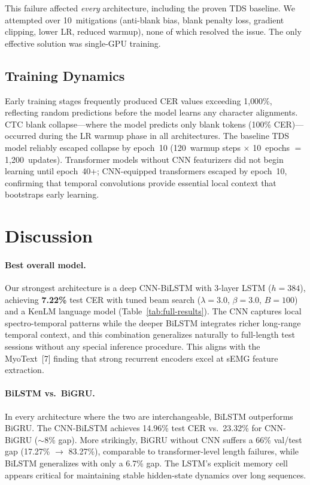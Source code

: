 \documentclass{article}
\begin{document}
This failure affected \emph{every} architecture, including the proven TDS baseline. We attempted over 10~mitigations (anti-blank bias, blank penalty loss, gradient clipping, lower LR, reduced warmup), none of which resolved the issue. The only effective solution was single-GPU training.


\subsection{Training Dynamics}

Early training stages frequently produced CER values exceeding 1{,}000\%, reflecting random predictions before the model learns any character alignments. CTC blank collapse---where the model predicts only blank tokens (100\% CER)---occurred during the LR warmup phase in all architectures. The baseline TDS model reliably escaped collapse by epoch~10 (120~warmup steps $\times$ 10~epochs $=$ 1{,}200~updates). Transformer models without CNN featurizers did not begin learning until epoch~40+; CNN-equipped transformers escaped by epoch~10, confirming that temporal convolutions provide essential local context that bootstraps early learning.


\section{Discussion}

\paragraph{Best overall model.} Our strongest architecture is a deep CNN-BiLSTM with 3-layer LSTM ($h{=}384$), achieving \textbf{7.22\%} test CER with tuned beam search ($\lambda{=}3.0$, $\beta{=}3.0$, $B{=}100$) and a KenLM language model (Table~\ref{tab:full-results}). The CNN captures local spectro-temporal patterns while the deeper BiLSTM integrates richer long-range temporal context, and this combination generalizes naturally to full-length test sessions without any special inference procedure. This aligns with the MyoText~[7] finding that strong recurrent encoders excel at sEMG feature extraction.

\paragraph{BiLSTM vs.\ BiGRU.} In every architecture where the two are interchangeable, BiLSTM outperforms BiGRU. The CNN-BiLSTM achieves 14.96\% test CER vs.\ 23.32\% for CNN-BiGRU (${\sim}$8\% gap). More strikingly, BiGRU without CNN suffers a 66\% val/test gap (17.27\% $\to$ 83.27\%), comparable to transformer-level length failures, while BiLSTM generalizes with only a 6.7\% gap. The LSTM's explicit memory cell appears critical for maintaining stable hidden-state dynamics over long sequences.
\end{document}
